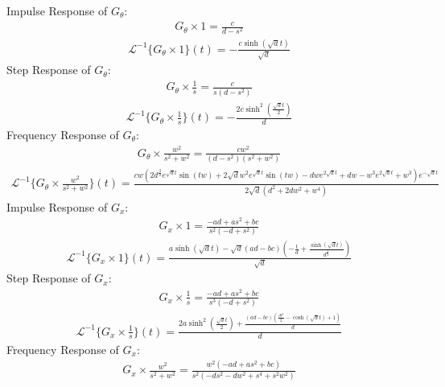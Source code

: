 \documentclass[a4paper,10pt,reqno]{article}
\newcommand{\lap}{\mathscr{L}}
\numberwithin{equation}{section}
\begin{document}
\noindent
Impulse Response of $G_{\theta}$: 
\begin{align}G_{\theta}\times1=\frac{c}{d - s^{2}}\end{align}
\begin{align} \lap^{-1} \{G_{\theta}\times1\} (t) =- \frac{c \sinh{\left(\sqrt{d} t \right)}}{\sqrt{d}}\end{align}
Step Response of $G_{\theta}$: 
\begin{align} G_{\theta}\times\frac{1}{s}=\frac{c}{s \left(d - s^{2}\right)}\end{align}
\begin{align} \lap^{-1} \{G_{\theta}\times\frac{1}{s}\} (t) =- \frac{2 c \sinh^{2}{\left(\frac{\sqrt{d} t}{2} \right)}}{d}\end{align}
Frequency Response of $G_{\theta}$: 
\begin{align} G_{\theta}\times\frac{w^{2}}{s^{2} + w^{2}}=\frac{c w^{2}}{\left(d - s^{2}\right) \left(s^{2} + w^{2}\right)}\end{align}
\begin{align} \lap^{-1} \{G_{\theta}\times\frac{w^{2}}{s^{2} + w^{2}}\} (t) =\frac{c w \left(2 d^{\frac{3}{2}} e^{\sqrt{d} t} \sin{\left(t w \right)} + 2 \sqrt{d} w^{2} e^{\sqrt{d} t} \sin{\left(t w \right)} - d w e^{2 \sqrt{d} t} + d w - w^{3} e^{2 \sqrt{d} t} + w^{3}\right) e^{- \sqrt{d} t}}{2 \sqrt{d} \left(d^{2} + 2 d w^{2} + w^{4}\right)}\end{align}
Impulse Response of $G_x$: 
\begin{align} G_x\times1=\frac{- a d + a s^{2} + b c}{s^{2} \left(- d + s^{2}\right)}\end{align}
\begin{align} \lap^{-1} \{G_x\times1\} (t) =\frac{a \sinh{\left(\sqrt{d} t \right)} - \sqrt{d} \left(a d - b c\right) \left(- \frac{t}{d} + \frac{\sinh{\left(\sqrt{d} t \right)}}{d^{\frac{3}{2}}}\right)}{\sqrt{d}}\end{align}
Step Response of $G_x$: 
\begin{align} G_x\times\frac{1}{s}=\frac{- a d + a s^{2} + b c}{s^{3} \left(- d + s^{2}\right)}\end{align}
\begin{align} \lap^{-1} \{G_x\times\frac{1}{s}\} (t) =\frac{2 a \sinh^{2}{\left(\frac{\sqrt{d} t}{2} \right)} + \frac{\left(a d - b c\right) \left(\frac{d t^{2}}{2} - \cosh{\left(\sqrt{d} t \right)} + 1\right)}{d}}{d}\end{align}
Frequency Response of $G_x$: 
\begin{align} G_x\times\frac{w^{2}}{s^{2} + w^{2}}=\frac{w^{2} \left(- a d + a s^{2} + b c\right)}{s^{2} \left(- d s^{2} - d w^{2} + s^{4} + s^{2} w^{2}\right)}\end{align}
\end{document}
